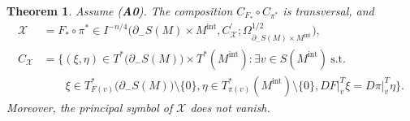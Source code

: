 \documentclass[a4paper,11pt,reqno]{amsart}
\numberwithin{equation}{section}
\newtheorem{theorem}{Theorem}[section]
\theoremstyle{definition}
\theoremstyle{remark}
\begin{document}
%
\begin{theorem}
\label{theorem:geodesicxraytransform1}
Assume {\rm ({\bf A0})}. 
The composition $C_{F_\ast}{\circ}C_{\pi^\ast}$ is transversal, and 
%
%
\begin{align*}
  \mathcal{X}
& =
  F_\ast{\circ}\pi^\ast
  \in
  I^{-n/4}
  \bigl(
  \partial_-S(M){\times}M^\text{int},
  C_\mathcal{X}^\prime;
  \Omega_{\partial_-S(M){\times}M^\text{int}}^{1/2}
  \bigr),
\\
  C_\mathcal{X}
& =
  \bigl\{
  (\xi,\eta) 
  \in 
  T^\ast\bigl(\partial_-S(M)\bigr){\times}T^\ast(M^\text{int}): 
  \exists v \in S(M^\text{int})\ \text{s.t.}\ 
\\
& \qquad 
  \xi \in T^\ast_{F(v)}\bigl(\partial_-S(M)\bigr)\setminus\{0\}, 
  \eta \in T^\ast_{\pi(v)}(M^\text{int})\setminus\{0\}, 
  DF\vert^T_v\xi=D\pi\vert^T_v\eta
  \bigr\}.
\end{align*}
%
%
Moreover, the principal symbol of $\mathcal{X}$ does not vanish. 
\end{theorem}
%
%
\end{document}
